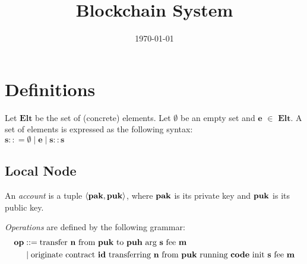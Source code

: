 \documentclass[a4paper]{llncs}
\title{Blockchain System}
\author{}
\institute{}
\date{\today}
\begin{document}
\maketitle
\pagestyle{plain}

\section{Definitions}
\begin{definition}%
Let $\mathbf{Elt}$ be the set of (concrete) elements. Let $\emptyset$ be an empty set and $\mathbf{e}$ $\in$  $\mathbf{Elt}$. A set of elements is expressed as the following syntax:
\\
$\mathbf{s} :: = \emptyset \mid \mathbf{e} \mid \mathbf{s :: s}$
\end{definition}

\subsection{Local Node}
\label{sec:local-node}


\begin{definition}%
  An \emph{account} is a tuple $\langle
  \PAK, \PUK
  \rangle $, where
  $\PAK$ is its private key and $\PUK$ is its public key.
\end{definition}


\begin{definition}%
  \emph{Operations} are defined by the following grammar:
  \begin{align*}
    \OP &::= \TRANSFER[\STRING]\NTEZ\PUK\PUH\MTEZ
    \\&\mid \ORIGINATE\ID\NTEZ\PUK\CODE\STRING\MTEZ
  \end{align*}
\end{definition}
\end{document}
